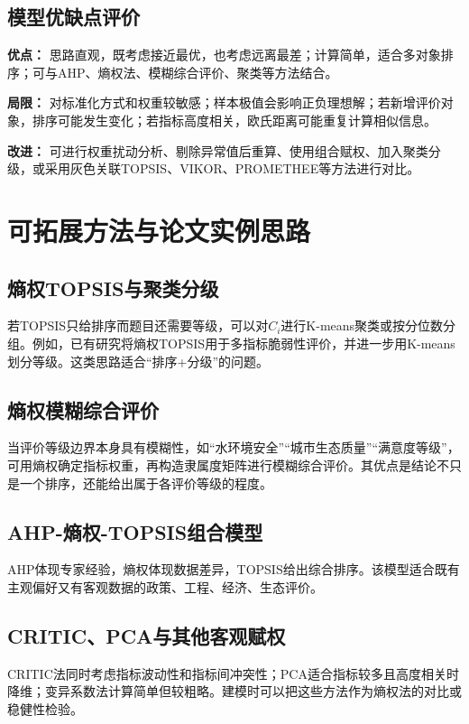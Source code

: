 \documentclass[UTF8,a4paper,12pt,fontset=none]{ctexart}
\begin{document}
\subsection{模型优缺点评价}
\textbf{优点：} 思路直观，既考虑接近最优，也考虑远离最差；计算简单，适合多对象排序；可与AHP、熵权法、模糊综合评价、聚类等方法结合。\par
\textbf{局限：} 对标准化方式和权重较敏感；样本极值会影响正负理想解；若新增评价对象，排序可能发生变化；若指标高度相关，欧氏距离可能重复计算相似信息。\par
\textbf{改进：} 可进行权重扰动分析、剔除异常值后重算、使用组合赋权、加入聚类分级，或采用灰色关联TOPSIS、VIKOR、PROMETHEE等方法进行对比。

\section{可拓展方法与论文实例思路}

\subsection{熵权TOPSIS与聚类分级}
若TOPSIS只给排序而题目还需要等级，可以对$C_i$进行K-means聚类或按分位数分组。例如，已有研究将熵权TOPSIS用于多指标脆弱性评价，并进一步用K-means划分等级。这类思路适合“排序+分级”的问题。

\subsection{熵权模糊综合评价}
当评价等级边界本身具有模糊性，如“水环境安全”“城市生态质量”“满意度等级”，可用熵权确定指标权重，再构造隶属度矩阵进行模糊综合评价。其优点是结论不只是一个排序，还能给出属于各评价等级的程度。

\subsection{AHP-熵权-TOPSIS组合模型}
AHP体现专家经验，熵权体现数据差异，TOPSIS给出综合排序。该模型适合既有主观偏好又有客观数据的政策、工程、经济、生态评价。

\subsection{CRITIC、PCA与其他客观赋权}
CRITIC法同时考虑指标波动性和指标间冲突性；PCA适合指标较多且高度相关时降维；变异系数法计算简单但较粗略。建模时可以把这些方法作为熵权法的对比或稳健性检验。
\end{document}
